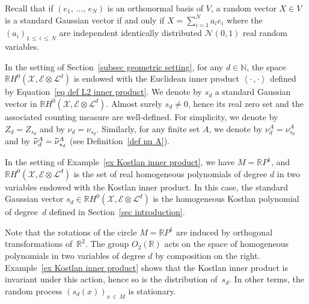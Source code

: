 \documentclass[AHL,Unicode,longabstracts,published]{cedram}
\newcommand{\E}{\mathcal{E}}
\newcommand{\X}{\mathcal{X}}
\renewcommand{\L}{\mathcal{L}}
\newcommand{\clN}{\mathcal{N}}
\newcommand{\N}{\mathbb{N}}
\newcommand{\R}{\mathbb{R}}
\newcommand{\prsc}[2]{\left\langle #1\,, #2 \right\rangle}
\renewcommand{\H}{H^0(\X,\E \otimes \L^d)}
\renewcommand{\leq}{\leqslant}
\renewcommand{\tilde}{\widetilde}
\let\oldtilde\tilde
\renewcommand*{\tilde}[1]{\mathchoice{\widetilde{#1}}{\widetilde{#1}}{\oldtilde{#1}}{\oldtilde{#1}}}
\begin{document}
\begin{rema}
Recall that if $(e_1,\,\dots,\,e_N)$ is an orthonormal basis of $V$, a random vector $X \in V$ is a standard Gaussian vector if and only if $X = \sum_{i=1}^N a_i e_i$ where the $(a_i)_{1\,\leq\,i\,\leq\,N}$ are independent identically distributed $\clN(0,1)$ real random variables.
\end{rema}

In the setting of Section~\ref{subsec geometric setting}, for any $d \in \N$, the space $\R\H$ is endowed with the Euclidean inner product $\prsc{\cdot}{\cdot}$ defined by Equation~\eqref{eq def L2 inner product}. We denote by $s_d$ a standard Gaussian vector in $\R\H$. Almost surely $s_d \neq 0$, hence its real zero set and the associated counting measure are well-defined. For simplicity, we denote by $Z_d = Z_{s_d}$ and by $\nu_d = \nu_{s_d}$. Similarly, for any finite set $A$, we denote by $\nu_d^A = \nu^A_{s_d}$ and by $\tilde{\nu}^A_d = \tilde{\nu}^A_{s_d}$ (see Definition~\ref{def nu A}).

\begin{exam}\label{ex Kostlan polynomials}
In the setting of Example~\ref{ex Kostlan inner product}, we have $M=\R P^1$, and $\R\H$ is the set of real homogeneous polynomials of degree $d$ in two variables endowed with the Kostlan inner product. In this case, the standard Gaussian vector $s_d \in \R\H$ is the homogeneous Kostlan polynomial of degree~$d$ defined in Section~\ref{sec introduction}.

Note that the rotations of the circle $M=\R P^1$ are induced by orthogonal transformations of~$\R^2$. The group $O_2(\R)$ acts on the space of homogeneous polynomials in two variables of degree $d$ by composition on the right. Example~\ref{ex Kostlan inner product} shows that the Kostlan inner product is invariant under this action, hence so is the distribution of~$s_d$. In other terms, the random process $(s_d(x))_{x\,\in\,M}$ is stationary.
\end{exam}
\end{document}
